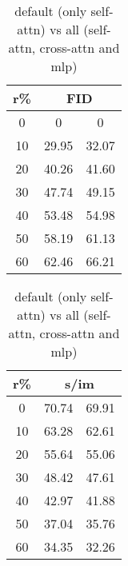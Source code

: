 \begin{table}[htp]
\caption{default (only self-attn) vs all (self-attn, cross-attn and mlp)}
\label{table:exp_1_1}
    \begin{minipage}{0.48\textwidth}
        \centering
        \begin{tabular}{|c||c|c|}
            \hline
            \multicolumn{1}{|c||}{r\%} & \multicolumn{2}{c|}{FID}\\
            \hline
            0 & 0 & 0 \\
            10 & 29.95 & 32.07 \\
            20 & 40.26 & 41.60 \\
            30 & 47.74 & 49.15 \\
            40 & 53.48 & 54.98 \\
            50 & 58.19 & 61.13 \\
            60 & 62.46 & 66.21 \\
            \hline
        \end{tabular}
    \end{minipage}
    \hfill
    \begin{minipage}{0.48\textwidth}
        \centering
        \begin{tabular}{|c||c|c|}
            \hline
            \multicolumn{1}{|c||}{r\%} & \multicolumn{2}{c|}{s/im}\\
            \hline
            0 & 70.74 & 69.91 \\
            10 & 63.28 & 62.61 \\
            20 & 55.64 & 55.06 \\
            30 & 48.42 & 47.61 \\
            40 & 42.97 & 41.88 \\
            50 & 37.04 & 35.76 \\
            60 & 34.35 & 32.26 \\
            \hline
        \end{tabular}
    \end{minipage}
\end{table}
